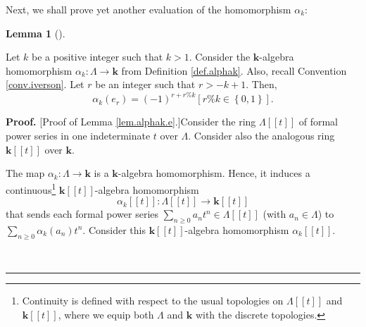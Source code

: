\documentclass[numbers=enddot,12pt,final,onecolumn,notitlepage]{scrartcl}%
\theoremstyle{definition}
\newtheorem{lem}[theo]{Lemma}
\newenvironment{lemma}[1][]
{\begin{lem}[#1]\begin{leftbar}}
{\end{leftbar}\end{lem}}
\newenvironment{proof}[1][Proof]{\noindent\textbf{#1.} }{\ \rule{0.5em}{0.5em}}
\let\sumnonlimits\sum
\renewcommand{\sum}{\sumnonlimits\limits}
\newenvironment{vershort}{}{}
\begin{document}
Next, we shall prove yet another evaluation of the homomorphism $\alpha_{k}$:

\begin{lemma}
\label{lem.alphak.e}Let $k$ be a positive integer such that $k>1$. Consider
the $\mathbf{k}$-algebra homomorphism $\alpha_{k}:\Lambda\rightarrow
\mathbf{k}$ from Definition \ref{def.alphak}. Also, recall Convention
\ref{conv.iverson}. Let $r$ be an integer such that $r>-k+1$. Then,%
\begin{equation}
\alpha_{k}\left(  e_{r}\right)  =\left(  -1\right)  ^{r+r\%k}\left[
r\%k\in\left\{  0,1\right\}  \right]  . \label{pf.thm.petk.explicit.aker}%
\end{equation}

\end{lemma}

\begin{proof}
[Proof of Lemma \ref{lem.alphak.e}.]Consider the ring $\Lambda\left[  \left[
t\right]  \right]  $ of formal power series in one indeterminate $t$ over
$\Lambda$. Consider also the analogous ring $\mathbf{k}\left[  \left[
t\right]  \right]  $ over $\mathbf{k}$.

\begin{vershort}
The map $\alpha_{k}:\Lambda\rightarrow\mathbf{k}$ is a $\mathbf{k}$-algebra
homomorphism. Hence, it induces a continuous\footnote{Continuity is defined
with respect to the usual topologies on $\Lambda\left[  \left[  t\right]
\right]  $ and $\mathbf{k}\left[  \left[  t\right]  \right]  $, where we equip
both $\Lambda$ and $\mathbf{k}$ with the discrete topologies.} $\mathbf{k}%
\left[  \left[  t\right]  \right]  $-algebra homomorphism%
\[
\alpha_{k}\left[  \left[  t\right]  \right]  :\Lambda\left[  \left[  t\right]
\right]  \rightarrow\mathbf{k}\left[  \left[  t\right]  \right]
\]
that sends each formal power series $\sum_{n\geq0}a_{n}t^{n}\in\Lambda\left[
\left[  t\right]  \right]  $ (with $a_{n}\in\Lambda$) to $\sum_{n\geq0}%
\alpha_{k}\left(  a_{n}\right)  t^{n}$. Consider this $\mathbf{k}\left[
\left[  t\right]  \right]  $-algebra homomorphism $\alpha_{k}\left[  \left[
t\right]  \right]  $.
\end{vershort}


\end{proof}
\end{document}
